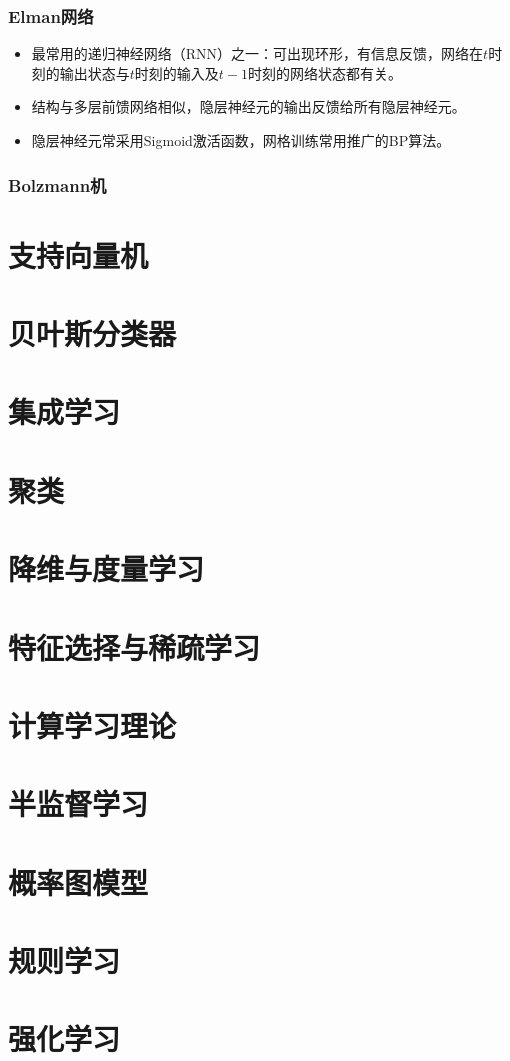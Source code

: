 \documentclass{ctexart}
\begin{document}
					\subsubsection{Elman网络}
						\begin{itemize}
							\item 最常用的递归神经网络（RNN）之一：可出现环形，有信息反馈，网络在$t$时刻的输出状态与$t$时刻的输入及$t-1$时刻的网络状态都有关。
							\item 结构与多层前馈网络相似，隐层神经元的输出反馈给所有隐层神经元。
							\item 隐层神经元常采用Sigmoid激活函数，网格训练常用推广的BP算法。
						\end{itemize}
					\subsubsection{Bolzmann机}
			\section{支持向量机}
			\section{贝叶斯分类器}
			\section{集成学习}
			\section{聚类}
			\section{降维与度量学习}
			\section{特征选择与稀疏学习}
			\section{计算学习理论}
			\section{半监督学习}
			\section{概率图模型}
			\section{规则学习}
			\section{强化学习}
			
\end{document}
